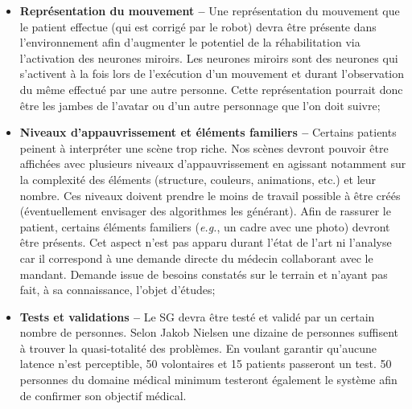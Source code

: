 \begin{itemize}
		\item \textbf{Représentation du mouvement --} Une représentation du mouvement que le patient effectue (qui est corrigé par le robot) devra être présente dans l'environnement afin d'augmenter le potentiel de la réhabilitation via l'activation des neurones miroirs. Les neurones miroirs sont des neurones qui s'activent à la fois lors de l'exécution d'un mouvement et durant l'observation du même effectué par une autre personne. Cette représentation pourrait donc être les jambes de l'avatar ou d'un autre personnage que l'on doit suivre;
		
		
		\item \textbf{Niveaux d'appauvrissement et éléments familiers --} Certains patients peinent à interpréter une scène trop riche. %
		Nos scènes devront pouvoir être affichées avec plusieurs niveaux d'appauvrissement en agissant notamment sur la complexité des éléments (structure, couleurs, animations, etc.) et leur nombre. Ces niveaux doivent prendre le moins de travail possible à être créés (éventuellement envisager des algorithmes les générant). Afin de rassurer le patient, certains éléments familiers (\textit{e.g.}, un cadre avec une photo) devront être présents. Cet aspect n'est pas apparu durant l'état de l'art ni l'analyse car il correspond à une demande directe du médecin collaborant avec le mandant. Demande issue de besoins constatés sur le terrain et n'ayant pas fait, à sa connaissance, l'objet d'études;%
		
		\item \textbf{Tests et validations --} Le SG devra être testé et validé par un certain nombre de personnes. Selon Jakob Nielsen une dizaine de personnes suffisent à trouver la quasi-totalité des problèmes. En voulant garantir qu'aucune latence n'est perceptible, 50 volontaires et 15 patients passeront un test. 50 personnes du domaine médical minimum testeront également le système afin de confirmer son objectif médical.
		
	\end{itemize}

